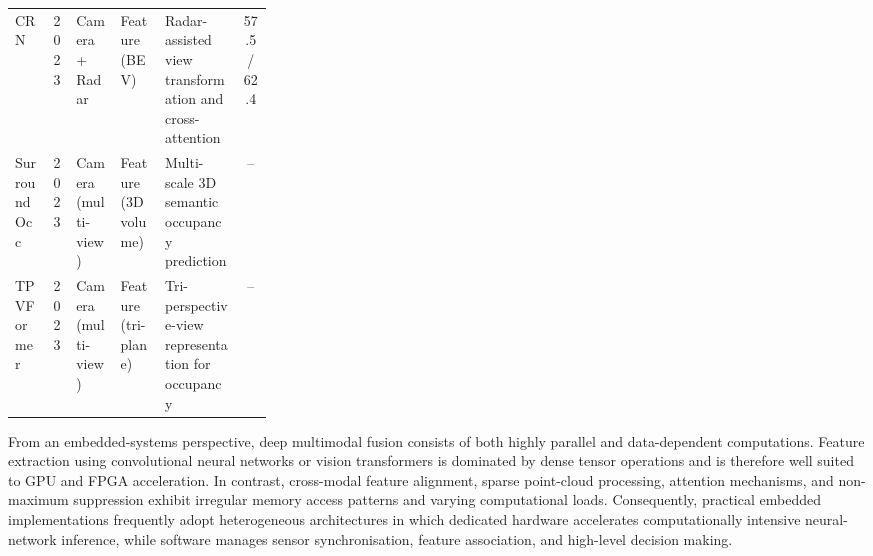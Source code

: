 \begin{table}[!t]
\begin{adjustbox}{max width=\textwidth}
\begin{tabular}{l c l l p{0.30\linewidth} c}
        CRN \cite{kim2023_crn} & 2023 & Camera + Radar & Feature (BEV) & Radar-assisted view transformation and cross-attention & 57.5 / 62.4 \\
        SurroundOcc \cite{wei2023_surroundocc} & 2023 & Camera (multi-view) & Feature (3D volume) & Multi-scale 3D semantic occupancy prediction & -- \\
        TPVFormer \cite{huang2023_tpvformer} & 2023 & Camera (multi-view) & Feature (tri-plane) & Tri-perspective-view representation for occupancy & -- \\
        \hline
    \end{tabular}
    \end{adjustbox}
\end{table}

From an embedded-systems perspective, deep multimodal fusion consists of both highly parallel and data-dependent computations. Feature extraction using convolutional neural networks or vision transformers is dominated by dense tensor operations and is therefore well suited to GPU and FPGA acceleration. In contrast, cross-modal feature alignment, sparse point-cloud processing, attention mechanisms, and non-maximum suppression exhibit irregular memory access patterns and varying computational loads. Consequently, practical embedded implementations frequently adopt heterogeneous architectures in which dedicated hardware accelerates computationally intensive neural-network inference, while software manages sensor synchronisation, feature association, and high-level decision making.

